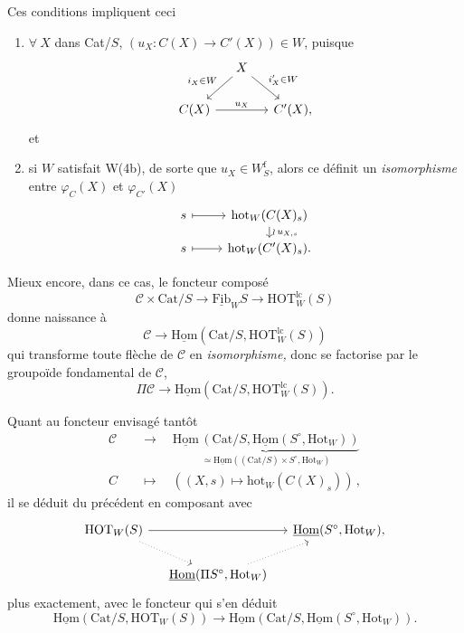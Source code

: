 \documentclass[11pt]{article}
\newcommand{\printedpage}[1]{\marginpar{\footnotesize p.~#1}}
\newcommand{\msp}[1]{\marginpar{\footnotesize [#1]}}
\newcommand{\Fib}{\underline{\mathrm{Fib}}}
\newcommand{\Hom}{\underline{\mathrm{Hom}}}
\newcommand{\Cat}{\mathrm{Cat}}
\newcommand{\HOT}{\mathrm{HOT}}
\newcommand{\Hot}{\mathrm{Hot}}
\newcommand{\hot}{\mathrm{hot}}
\begin{document}
\msp{page 199}Ces conditions impliquent ceci

\begin{enumerate}
\item[a)] $\forall\ X$ dans Cat/$S$, $(u_X : C(X) \longrightarrow C'(X)) \in W$, puisque
\[
\begin{tikzcd}[column sep=small]
 & X \arrow[dl, "i_X\in W"'] \arrow[dr, "i'_X\in W"] & \\
C(X) \arrow[rr, "u_X"] & & C'(X),
\end{tikzcd}
\]
\printedpage{131}
et

\item[b)] si $W$ satisfait W(4b), de sorte que $u_X \in W^{\mathrm{f}}_S$, alors ce définit un \textit{isomorphisme} entre $\varphi_C(X)$ et $\varphi_{C'}(X)$ %
\[
\begin{tikzcd}[row sep=small]
s \arrow[r, mapsto] & \hot_W(C(X)_s) \arrow[d, "\wr\, u_{X,s}"] \\
s \arrow[r, mapsto] & \hot_W(C'(X)_s).
\end{tikzcd}
\]
\end{enumerate}

Mieux encore, dans ce cas, le foncteur composé
\[
\mathcal{C} \times \Cat/S \longrightarrow \Fib_W S \longrightarrow \HOT^{\mathrm{lc}}_W(S)
\]
donne naissance à
\[
\mathcal{C} \longrightarrow \Hom(\Cat/S, \HOT^{\mathrm{lc}}_W(S))
\]
qui transforme toute flèche de $\mathcal{C}$ en \textit{isomorphisme,} donc se factorise par le groupoïde fondamental de $\mathcal{C}$,
\[
\Pi\mathcal{C} \longrightarrow \Hom(\Cat/S, \HOT^{\mathrm{lc}}_W(S)).
\]

\msp{page 200}Quant au foncteur envisagé tantôt
\[
\begin{aligned}
\mathcal{C} &\quad\longrightarrow\quad \underbrace{\Hom\,(\Cat/S, \Hom(S^\circ, \Hot_W))}_{\simeq\Hom((\Cat/S)\times S^\circ, \Hot_W)} \\
C &\quad\longmapsto\quad ((X,s) \longmapsto \hot_W(C(X)_s))\,,
\end{aligned}
\]
il se déduit du précédent en composant avec
\[
\begin{tikzcd}[column sep=small]
\HOT_W(S) \arrow[rr] \arrow[dr, dotted] & & \Hom(S^\circ, \Hot_W), \\
 & \Hom(\Pi S^\circ, \Hot_W) \arrow[ur, dotted] &
\end{tikzcd}
\]
plus exactement, avec le foncteur qui s'en déduit
\[
\Hom(\Cat/S, \HOT_W(S)) \longrightarrow \Hom(\Cat/S, \Hom(S^\circ, \Hot_W)).
\]
\end{document}
